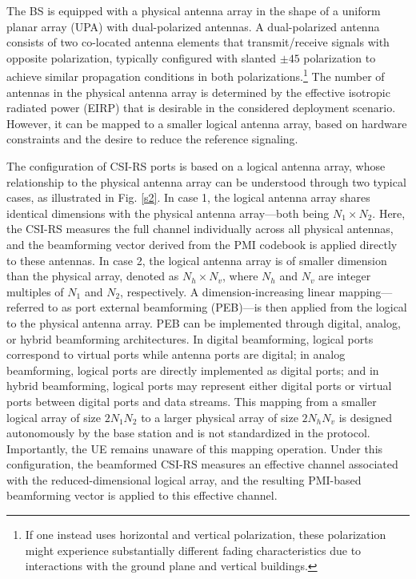 \documentclass[lettersize,journal]{IEEEtran}
\begin{document}
The BS is equipped with a physical antenna array in the shape of a uniform planar array (UPA) with dual-polarized antennas. A dual-polarized antenna consists of two co-located antenna elements that transmit/receive signals with opposite polarization, typically configured with slanted $\pm 45$ polarization to achieve similar propagation conditions in both polarizations.\footnote{If one instead uses horizontal and vertical polarization, these polarization might experience substantially different fading characteristics due to interactions with the ground plane and vertical buildings.}
The number of antennas in the physical antenna array is determined by the effective isotropic radiated power (EIRP) that is desirable in the considered deployment scenario. However, it can be mapped to a smaller logical antenna array, based on hardware constraints and the desire to reduce the reference signaling.


The configuration of CSI-RS ports is based on a logical antenna array, whose relationship to the physical antenna array can be understood through two typical cases, as illustrated in Fig. \ref{s2}. In case 1, the logical antenna array shares identical dimensions with the physical antenna array—both being $N_1 \times N_2$. Here, the CSI-RS measures the full channel individually across all physical antennas, and the beamforming vector derived from the PMI codebook is applied directly to these antennas. In case 2, the logical antenna array is of smaller dimension than the physical array, denoted as $N_h \times N_v$, where $N_h$ and $N_v$ are integer multiples of $N_1$ and $N_2$, respectively. A dimension-increasing linear mapping—referred to as port external beamforming (PEB)—is then applied from the logical to the physical antenna array. PEB can be implemented through digital, analog, or hybrid beamforming architectures. In digital beamforming, logical ports correspond to virtual ports while antenna ports are digital; in analog beamforming, logical ports are directly implemented as digital ports; and in hybrid beamforming, logical ports may represent either digital ports or virtual ports between digital ports and data streams. This mapping from a smaller logical array of size $2N_1N_2$ to a larger physical array of size $2N_hN_v$ is designed autonomously by the base station and is not standardized in the protocol. Importantly, the UE remains unaware of this mapping operation. Under this configuration, the beamformed CSI-RS measures an effective channel associated with the reduced-dimensional logical array, and the resulting PMI-based beamforming vector is applied to this effective channel.
\end{document}
